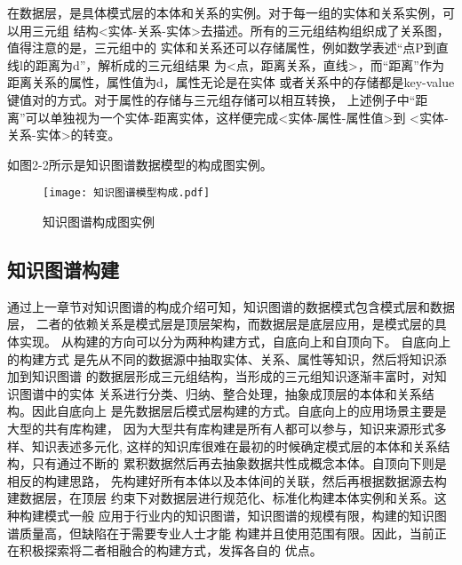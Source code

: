 \documentclass{standalone}
\begin{document}
在数据层，是具体模式层的本体和关系的实例。对于每一组的实体和关系实例，可以用三元组
结构<实体-关系-实体>去描述。所有的三元组结构组织成了关系图，值得注意的是，三元组中的
实体和关系还可以存储属性，例如数学表述“点P到直线l的距离为d”，解析成的三元组结果
为<点，距离关系，直线>，而“距离”作为距离关系的属性，属性值为d，属性无论是在实体
或者关系中的存储都是key-value键值对的方式。对于属性的存储与三元组存储可以相互转换，
上述例子中“距离”可以单独视为一个实体-距离实体，这样便完成<实体-属性-属性值>到
<实体-关系-实体>的转变。


如图2-2所示是知识图谱数据模型的构成图实例。
\begin{figure}[htbp]
	\texttt{[image: 知识图谱模型构成.pdf]}
	\caption{知识图谱构成图实例}
	\label{知识图谱模型构成}
\end{figure}
\subsection{知识图谱构建}
通过上一章节对知识图谱的构成介绍可知，知识图谱的数据模式包含模式层和数据层，
二者的依赖关系是模式层是顶层架构，而数据层是底层应用，是模式层的具体实现。
从构建的方向可以分为两种构建方式，自底向上和自顶向下。
自底向上的构建方式
是先从不同的数据源中抽取实体、关系、属性等知识，然后将知识添加到知识图谱
的数据层形成三元组结构，当形成的三元组知识逐渐丰富时，对知识图谱中的实体
关系进行分类、归纳、整合处理，抽象成顶层的本体和关系结构。因此自底向上
是先数据层后模式层构建的方式。自底向上的应用场景主要是大型的共有库构建，
因为大型共有库构建是所有人都可以参与，知识来源形式多样、知识表述多元化,
这样的知识库很难在最初的时候确定模式层的本体和关系结构，只有通过不断的
累积数据然后再去抽象数据共性成概念本体。自顶向下则是相反的构建思路，
先构建好所有本体以及本体间的关联，然后再根据数据源去构建数据层，在顶层
约束下对数据层进行规范化、标准化构建本体实例和关系。这种构建模式一般
应用于行业内的知识图谱，知识图谱的规模有限，构建的知识图谱质量高，但缺陷在于需要专业人士才能
构建并且使用范围有限。因此，当前正在积极探索将二者相融合的构建方式，发挥各自的
优点。
\end{document}
